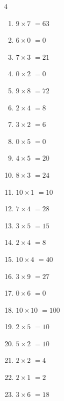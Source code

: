\begin{multicols}{4}
\begin{enumerate}
  \item $9\times 7$
        $=63$

  \item $6\times 0$
        $=0$

  \item $7\times 3$
        $=21$

  \item $0\times 2$
        $=0$

  \item $9\times 8$
        $=72$

\columnbreak %

  \item $2\times 4$
        $=8$

  \item $3\times 2$
        $=6$

  \item $0\times 5$
        $=0$

  \item $4\times 5$
        $=20$

  \item $8\times 3$
        $=24$

  \item $10\times 1$
        $=10$

  \item $7\times 4$
        $=28$

  \item $3\times 5$
        $=15$

  \item $2\times 4$
        $=8$

  \item $10\times 4$
        $=40$

  \item $3\times 9$
        $=27$

  \item $0\times 6$
        $=0$

  \item $10\times 10$
        $=100$

  \item $2\times 5$
        $=10$

  \item $5\times 2$
        $=10$

  \item $2\times 2$
        $=4$

  \item $2\times 1$
        $=2$

  \item $3\times 6$
        $=18$


\end{enumerate}
\end{multicols}

